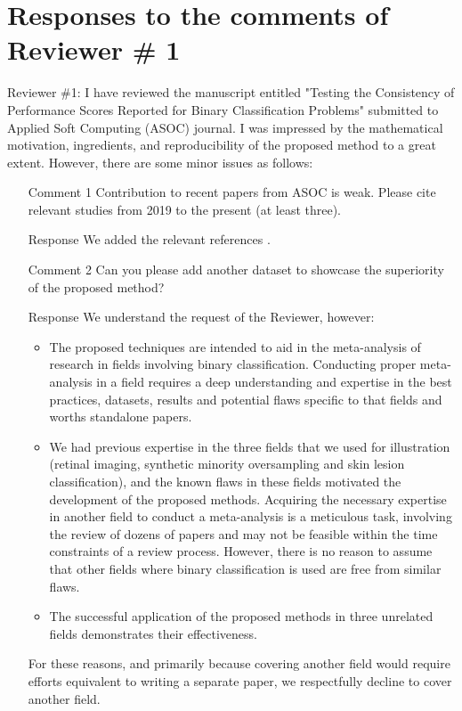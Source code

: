 \documentclass{article}
\begin{document}
\section{Responses to the comments of Reviewer \# 1}
Reviewer \#1: I have reviewed the manuscript entitled "Testing the Consistency of Performance Scores Reported for Binary Classification Problems" submitted to Applied Soft Computing (ASOC) journal. I was impressed by the mathematical motivation, ingredients, and reproducibility of the proposed method to a great extent. However, there are some minor issues as follows:
\begin{itemize}
\item [Comment 1] Contribution to recent papers from ASOC is weak. Please cite relevant studies from 2019 to the present (at least three).
\item [Response] We added the relevant references \cite{add0, add1, add2}.
\item [Comment 2] Can you please add another dataset to showcase the superiority of the proposed method?
\item [Response] We understand the request of the Reviewer, however:
\begin{itemize}
    \item The proposed techniques are intended to aid in the meta-analysis of research in fields involving binary classification. Conducting proper meta-analysis in a field requires a deep understanding and expertise in the best practices, datasets, results and potential flaws specific to that fields and worths standalone papers.
    \item We had previous expertise in the three fields that we used for illustration (retinal imaging, synthetic minority oversampling and skin lesion classification), and the known flaws in these fields motivated the development of the proposed methods. Acquiring the necessary expertise in another field to conduct a meta-analysis is a meticulous task, involving the review of dozens of papers and may not be feasible within the time constraints of a review process. However, there is no reason to assume that other fields where binary classification is used are free from similar flaws.
    \item The successful application of the proposed methods in three unrelated fields demonstrates their effectiveness.
\end{itemize}
For these reasons, and primarily because covering another field would require efforts equivalent to writing a separate paper, we respectfully decline to cover another field.

\end{itemize}
\end{document}
